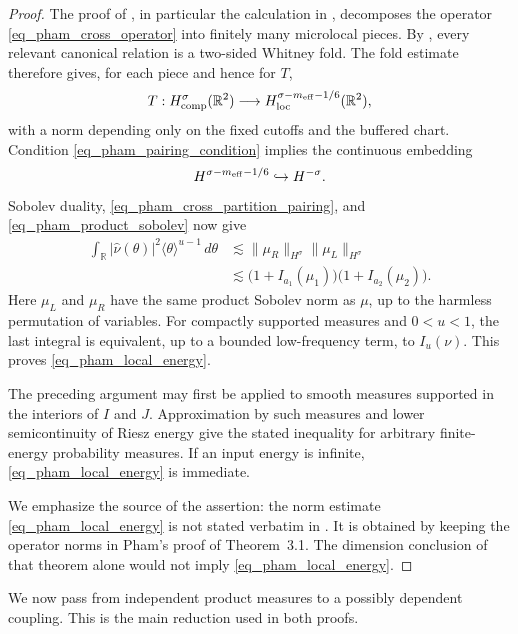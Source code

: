 \documentclass[11pt]{article}
\begin{document}
\begin{proof}
The proof of \cite[Theorem~3.1]{PhamFIO}, in particular the
calculation in \cite[(3.8)--(3.9)]{PhamFIO}, decomposes the operator
\eqref{eq_pham_cross_operator} into finitely many microlocal pieces.
By \cite[Lemma~4.2]{PhamFIO}, every relevant canonical relation is a
two-sided Whitney fold.  The fold estimate
\cite[Theorem~2.2]{PhamFIO} therefore gives, for each piece and hence
for \(T\),
\begin{equation}
 T:H^\sigma_{\rm comp}(\mathbb R^2)
 \longrightarrow
 H^{\sigma-m_{\rm eff}-1/6}_{\rm loc}(\mathbb R^2),
 \label{eq_pham_cross_mapping}
\end{equation}
with a norm depending only on the fixed cutoffs and the buffered
chart.  Condition \eqref{eq_pham_pairing_condition} implies the
continuous embedding
\[
 H^{\sigma-m_{\rm eff}-1/6}\hookrightarrow H^{-\sigma}.
\]
Sobolev duality, \eqref{eq_pham_cross_partition_pairing}, and
\eqref{eq_pham_product_sobolev} now give
\begin{align*}
 \int_{\mathbb R}|\widehat\nu(\theta)|^2
 \langle\theta\rangle^{u-1}\,d\theta
 &\lesssim
 \|\mu_R\|_{H^\sigma}\|\mu_L\|_{H^\sigma}\\
 &\lesssim
 \bigl(1+I_{a_1}(\mu_1)\bigr)
 \bigl(1+I_{a_2}(\mu_2)\bigr).
\end{align*}
Here \(\mu_L\) and \(\mu_R\) have the same product Sobolev norm as
\(\mu\), up to the harmless permutation of variables.
For compactly supported measures and $0<u<1$, the last integral is
equivalent, up to a bounded low-frequency term, to $I_u(\nu)$.
This proves \eqref{eq_pham_local_energy}.

The preceding argument may first be applied to smooth measures
supported in the interiors of $I$ and $J$.  Approximation by such
measures and lower semicontinuity of Riesz energy give the stated
inequality for arbitrary finite-energy probability measures.  If an
input energy is infinite, \eqref{eq_pham_local_energy} is immediate.

We emphasize the source of the assertion: the norm estimate
\eqref{eq_pham_local_energy} is not stated verbatim in
\cite{PhamFIO}.  It is obtained by keeping the operator norms in
Pham's proof of Theorem~3.1.  The dimension conclusion of that theorem
alone would not imply \eqref{eq_pham_local_energy}.
\end{proof}

We now pass from independent product measures to a possibly dependent
coupling.  This is the main reduction used in both proofs.
\end{document}
